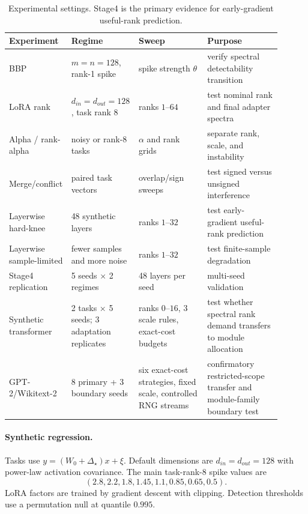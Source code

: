 \documentclass[10pt,twocolumn]{article}
\theoremstyle{definition}
\newcommand{\DeltaStar}{\Delta_\star}
\begin{document}
\begin{table}[t]
\centering
\small
\caption{Experimental settings.  Stage4 is the primary evidence for early-gradient useful-rank prediction.}
\label{tab:settings}
\begin{tabular}{p{0.16\linewidth}p{0.22\linewidth}p{0.25\linewidth}p{0.27\linewidth}}
\toprule
Experiment & Regime & Sweep & Purpose \\
\midrule
BBP & $m=n=128$, rank-1 spike & spike strength $\theta$ & verify spectral detectability transition \\
LoRA rank & $d_{in}=d_{out}=128$, task rank 8 & ranks $1$--$64$ & test nominal rank and final adapter spectra \\
Alpha / rank-alpha & noisy or rank-8 tasks & $\alpha$ and rank grids & separate rank, scale, and instability \\
Merge/conflict & paired task vectors & overlap/sign sweeps & test signed versus unsigned interference \\
Layerwise hard-knee & 48 synthetic layers & ranks $1$--$32$ & test early-gradient useful-rank prediction \\
Layerwise sample-limited & fewer samples and more noise & ranks $1$--$32$ & test finite-sample degradation \\
Stage4 replication & 5 seeds $\times$ 2 regimes & 48 layers per seed & multi-seed validation \\
Synthetic transformer & 2 tasks $\times$ 5 seeds; 3 adaptation replicates & ranks $0$--$16$, 3 scale rules, exact-cost budgets & test whether spectral rank demand transfers to module allocation \\
GPT-2/Wikitext-2 & 8 primary + 3 boundary seeds & six exact-cost strategies, fixed scale, controlled RNG streams & confirmatory restricted-scope transfer and module-family boundary test \\
\bottomrule
\end{tabular}
\end{table}

\paragraph{Synthetic regression.}
Tasks use $y=(W_0+\DeltaStar)x+\xi$.  Default dimensions are $d_{in}=d_{out}=128$ with power-law activation covariance.  The main task-rank-8 spike values are
\begin{equation}
    (2.8,2.2,1.8,1.45,1.1,0.85,0.65,0.5).
\end{equation}
LoRA factors are trained by gradient descent with clipping.  Detection thresholds use a permutation null at quantile $0.995$.
\end{document}
